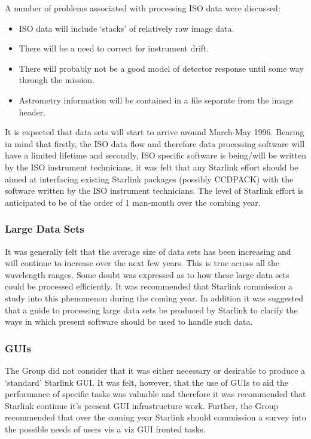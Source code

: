A number of problems associated with processing ISO data were
discussed:

\begin{itemize}
\item ISO data will include `stacks' of relatively raw image data.
\item There will be a need to correct for instrument drift.
\item There will probably not be a good model of detector response until 
some way through the mission.
\item Astrometry information will be contained in a file separate from 
the image header.
\end{itemize}

It is expected that data sets will start to arrive around March-May
1996.  Bearing in mind that firstly, the ISO data flow and therefore
data processing software will have a limited lifetime and secondly,
ISO specific software is being/will be written by the ISO instrument
technicians, it was felt that any Starlink effort should be aimed at
interfacing existing Starlink packages (possibly CCDPACK) with the
software written by the ISO instrument technicians. The level of
Starlink effort is anticipated to be of the order of 1 man-month over
the combing year.

\subsubsection{Large Data Sets}

It was generally felt that the average size of data sets has been
increasing and will continue to increase over the next few years. This
is true across all the wavelength ranges. Some doubt was expressed as
to how these large data sets could be processed efficiently. It was
recommended that Starlink commission a study into this phenomenon
during the coming year. In addition it was suggested that a guide to
processing large data sets be produced by Starlink to clarify the ways
in which present software should be used to handle such data.

\subsubsection{GUIs}

The Group did not consider that it was either necessary or desirable
to produce a `standard' Starlink GUI. It was felt, however, that the
use of GUIs to aid the performance of specific tasks was valuable and
therefore it was recommended that Starlink continue it's present GUI
infrastructure work. Further, the Group recommended that over the
coming year Starlink should commission a survey into the possible
needs of users vis a viz GUI fronted tasks.

